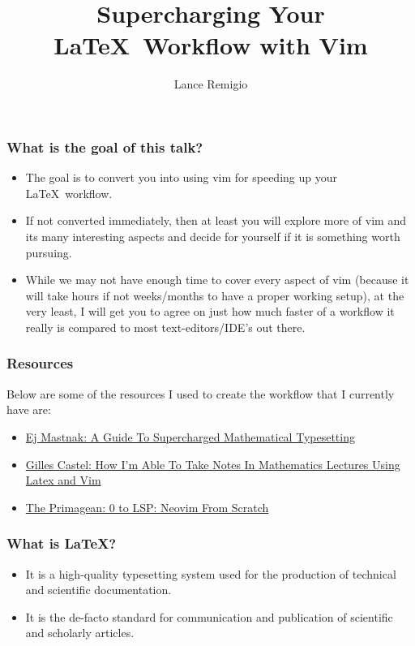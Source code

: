 \documentclass{beamer}
\author{Lance Remigio}
\title{Supercharging Your \LaTeX \  Workflow with Vim}
\institute{Sacramento State University}
\begin{document}
\maketitle

\begin{frame}
    \frametitle{What is the goal of this talk?}
    \begin{itemize}
        \item The goal is to convert you into using vim for speeding up your \LaTeX \ workflow. 
        \item If not converted immediately, then at least you will explore more of vim and its many interesting aspects and decide for yourself if it is something worth pursuing.  
        \item While we may not have enough time to cover every aspect of vim (because it will take hours if not weeks/months to have a proper working setup), at the very least, I will get you to agree on just how much faster of a workflow it really is compared to most text-editors/IDE's out there. 
    \end{itemize}
\end{frame}

\begin{frame}
    \frametitle{Resources}
    Below are some of the resources I used to create the workflow that I currently have are:
    \begin{itemize}
        \item \href{https://ejmastnak.com/tutorials/vim-latex/intro/}{Ej Mastnak: A Guide To Supercharged Mathematical Typesetting} 
        \item \href{https://castel.dev/post/lecture-notes-1/}{Gilles Castel: How I'm Able To Take Notes In Mathematics Lectures Using Latex and Vim} 
        \item \href{https://www.youtube.com/watch?v=w7i4amO_zaE&t=8s}{The Primagean: 0 to LSP: Neovim From Scratch}
    \end{itemize}
\end{frame}

\begin{frame}
    \frametitle{What is \LaTeX?} 
    \begin{itemize}
        \item It is a high-quality typesetting system used for the production of technical and scientific documentation.
        \item It is the de-facto standard for communication and publication of scientific and scholarly articles.
    \end{itemize}
\end{frame}
\end{document}
